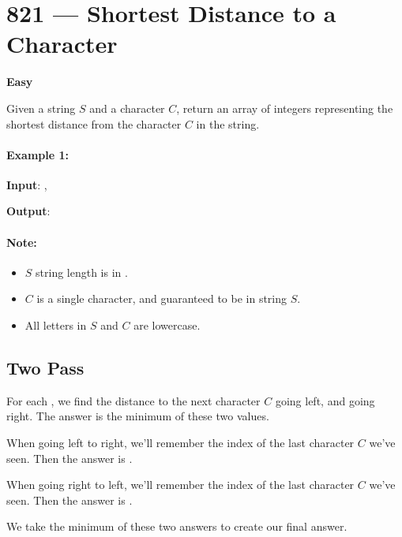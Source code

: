 \section{821 --- Shortest Distance to a Character}

\textbf{Easy}

Given a string $S$ and a character $C$, return an array of integers representing the shortest distance from the character $C$ in the string.

\paragraph{Example 1:}

\begin{flushleft}
\textbf{Input}: , 

\textbf{Output}: \fcj{[3, 2, 1, 0, 1, 0, 0, 1, 2, 2, 1, 0]}
\end{flushleft}

\paragraph{Note:}

\begin{itemize}
\item $S$ string length is in \fcj{[1, 10000]}.
\item $C$ is a single character, and guaranteed to be in string $S$.
\item All letters in $S$ and $C$ are lowercase.
\end{itemize}

\subsection{Two Pass}
For each , we find the distance to the next character $C$ going left, and going right. The answer is the minimum of these two values.

When going left to right, we'll remember the index  of the last character $C$ we've seen. Then the answer is .

When going right to left, we'll remember the index  of the last character $C$ we've seen. Then the answer is .

We take the minimum of these two answers to create our final answer.

\setcounter{lstlisting}{0}
